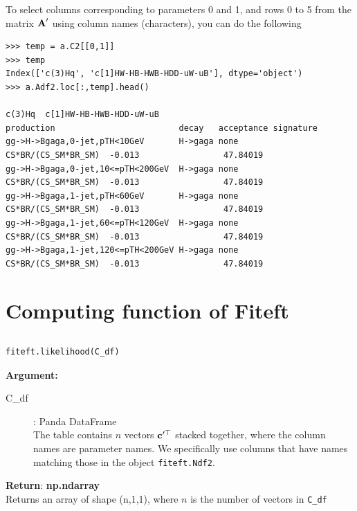 \documentclass[12pt]{article}
\def\b#1{\boldsymbol{\rm #1}}
\begin{document}
To select columns corresponding to parameters 0 and 1, and rows 0 to 5 from the matrix $\b A'$ using column names (characters), you can do the following
\begin{verbatim}
>>> temp = a.C2[[0,1]]
>>> temp
Index(['c(3)Hq', 'c[1]HW-HB-HWB-HDD-uW-uB'], dtype='object')
>>> a.Adf2.loc[:,temp].head()
                                                                           c(3)Hq  c[1]HW-HB-HWB-HDD-uW-uB
production                         decay   acceptance signature                                           
gg->H->Bgaga,0-jet,pTH<10GeV       H->gaga none       CS*BR/(CS_SM*BR_SM)  -0.013                 47.84019
gg->H->Bgaga,0-jet,10<=pTH<200GeV  H->gaga none       CS*BR/(CS_SM*BR_SM)  -0.013                 47.84019
gg->H->Bgaga,1-jet,pTH<60GeV       H->gaga none       CS*BR/(CS_SM*BR_SM)  -0.013                 47.84019
gg->H->Bgaga,1-jet,60<=pTH<120GeV  H->gaga none       CS*BR/(CS_SM*BR_SM)  -0.013                 47.84019
gg->H->Bgaga,1-jet,120<=pTH<200GeV H->gaga none       CS*BR/(CS_SM*BR_SM)  -0.013                 47.84019
\end{verbatim}




\section{Computing function of Fiteft}

\subsection{}
\begin{verbatim}
fiteft.likelihood(C_df)
\end{verbatim}
\textbf{Argument:}
\begin{description}
  \item[C\_df]: Panda DataFrame\\
  The table contains $n$ vectors $\b c'^\top$ stacked together, where the column names are parameter names. We specifically use columns that have names matching those in the object \verb|fiteft.Ndf2|.
 \end{description}
 \textbf{Return}: \textbf{np.ndarray}\\
 \indent Returns an array of shape (n,1,1), where $n$ is the number of vectors in \verb|C_df|
\end{document}
